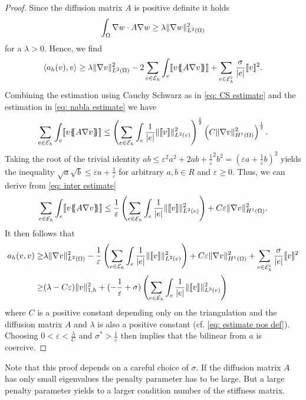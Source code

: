 \begin{proof}
	Since the diffusion matrix $A$ is positive definite it holds
	\begin{align}
		\int_\Omega \nabla w \cdot A \nabla w \geq \lambda \lVert \nabla w  \rVert_{L^2(\Omega)}^2  \label{eq: estimate pos def}
	\end{align}
	for a $\lambda >0$.
	Hence, we find
	\[
		 \langle a_h(v), v \rangle  \geq \lambda \lVert \nabla v  \rVert_{L^2(\Omega)}^2 - 2 \sum\limits_{e \in \mathcal{E}_h}\int_{e} \llbracket v \{\!\!\{ A \nabla v \}\!\!\}  \rrbracket + \sum_{e\in \mathcal{E}_h^i} \frac \sigma {|e|} \llbracket v \rrbracket^2 .
	\] 
	Combining the estimation using Cauchy Schwarz as in \eqref{eq: CS estimate} and the estimation in \eqref{eq: nabla estimate} we have
	\begin{align}
		\sum\limits_{e \in \mathcal{E}_h}\int_{e} \llbracket v \{\!\!\{ A \nabla v \}\!\!\}  \rrbracket \leq \left( \sum\limits_{e \in \mathcal{E}_h}\int_{e} \frac 1 {|e|}\lVert \llbracket v \rrbracket \rVert_{L^2(e)}^2 \right)^{\frac 1 2}
		\left( C \lVert \nabla v \rVert_{H^1(\Omega)}^2 \right)^{\frac 1 2}.\label{eq: inter estimate}
	\end{align}
	Taking the root of the trivial identity $ab \leq \varepsilon^2 a^2 + 2ab + {\frac 1 \varepsilon}^2b^2 = \left( \varepsilon a + \frac 1 \varepsilon b\right)^2$ yields the inequality $\sqrt{a} \sqrt{b} \leq \varepsilon a + \frac 1 \varepsilon$ for arbitrary $a,b \in R$ and $\varepsilon \geq 0$. Thus, we can derive from \eqref{eq: inter estimate}
	\begin{align*}
		\sum\limits_{e \in \mathcal{E}_h}\int_{e} \llbracket v \{\!\!\{ A \nabla v \}\!\!\}  \rrbracket \leq \frac 1 \varepsilon\left( \sum\limits_{e \in \mathcal{E}_h}\int_{e} \frac 1 {|e|}\lVert \llbracket v \rrbracket \rVert_{L^2(e)}^2 \right)
		+ C\varepsilon \lVert \nabla v \rVert_{H^1(\Omega)}^2.
	\end{align*}
	It then follows that
	\begin{align*}
		a_h(v,v)  \geq& \lambda \lVert \nabla v  \rVert_{L^2(\Omega)}^2 - \frac 1 \varepsilon\left( \sum\limits_{e \in \mathcal{E}_h}\int_{e} \frac 1 {|e|}\lVert \llbracket v \rrbracket \rVert_{L^2(e)}^2 \right)
		+ C \varepsilon \lVert \nabla v \rVert_{H^1(\Omega)}^2 + \sum_{e\in \mathcal{E}_h^i} \frac \sigma {|e|} \llbracket v \rrbracket^2 \\ 
		\geq& (\lambda - C\varepsilon) \lVert v  \rVert_{1,h}^2 + (-\frac 1 \varepsilon+\sigma) \left( \sum\limits_{e \in \mathcal{E}_h}\int_{e} \frac 1 {|e|}\lVert \llbracket v \rrbracket \rVert_{L^2(e)}^2 \right)
	\end{align*}
	where $C$ is a positive constant depending only on the triangulation and the diffusion matrix $A$ and $\lambda$ is also a positive constant (cf. \eqref{eq: estimate pos def}).
	Choosing $0 < \varepsilon < \frac \lambda C$ and $\sigma^* > \frac 1 \varepsilon$ then implies that 
	the bilinear from $a$ is coercive. 
\end{proof}
Note that this proof depends on a careful choice of $\sigma$. If the diffusion matrix $A$ has only small eigenvalues the penalty parameter has to be large. But a large penalty parameter yields to a larger condition number of the stiffness matrix.

